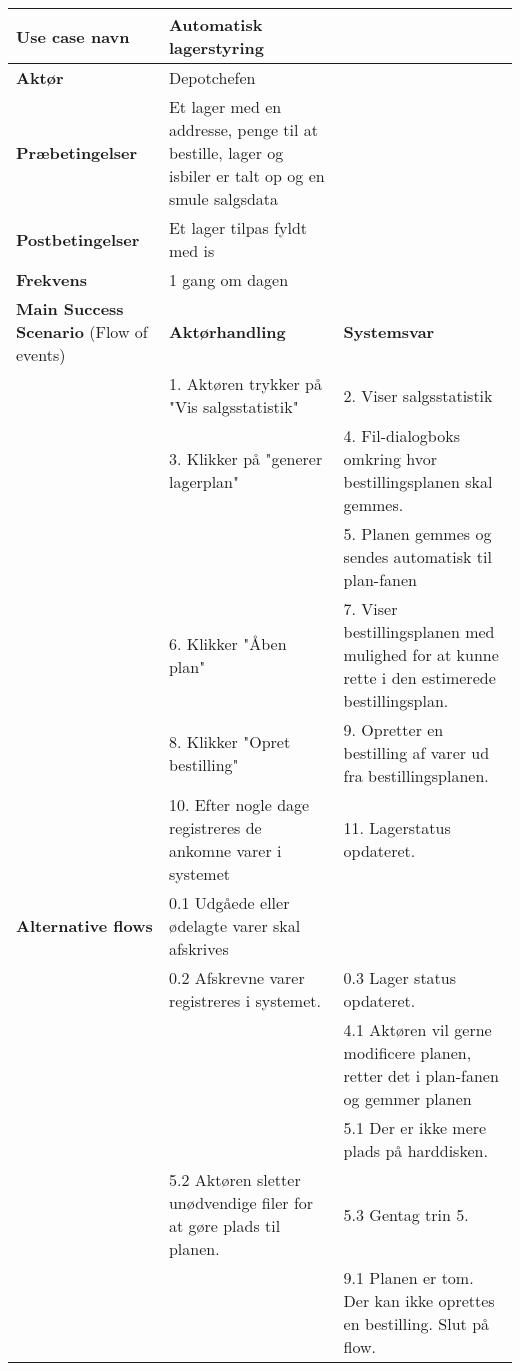 \begin{longtable}{ |p{120pt}|p{120pt}|p{120pt}| }
    \hline
    \textbf{Use case navn} & Automatisk lagerstyring & \\
    \hline
    \textbf{Aktør} & Depotchefen & \\
    \hline
    \textbf{Præbetingelser} & Et lager med en addresse, penge til at bestille, lager og isbiler er talt op og en smule salgsdata & \\
    \hline
    \textbf{Postbetingelser} & Et lager tilpas fyldt med is & \\
    \hline
    \textbf{Frekvens} & 1 gang om dagen & \\
    \hline
    \textbf{Main Success Scenario} (Flow of events) & \textbf{Aktørhandling} & \textbf{Systemsvar} \\
    \hline
    & 1. Aktøren trykker på "Vis salgsstatistik" & 2. Viser salgsstatistik \\
    \hline
    & 3. Klikker på "generer lagerplan" & 4. Fil-dialogboks omkring hvor bestillingsplanen skal gemmes. \\
    & & 5. Planen gemmes og sendes automatisk til plan-fanen \\
    \hline
    & 6. Klikker "Åben plan" & 7. Viser bestillingsplanen med mulighed for at kunne rette i den estimerede bestillingsplan. \\
    \hline
    & 8. Klikker "Opret bestilling" & 9. Opretter en bestilling af varer ud fra bestillingsplanen. \\
    \hline
    & 10. Efter nogle dage registreres de ankomne varer i systemet & 11. Lagerstatus opdateret. \\
    \hline
    \textbf{Alternative flows} & 0.1 Udgåede eller ødelagte varer skal afskrives & \\
    \hline
    & 0.2 Afskrevne varer registreres i systemet. & 0.3 Lager status opdateret. \\
    \hline
    & & 4.1 Aktøren vil gerne modificere planen, retter det i plan-fanen og gemmer planen & \\
    \hline
    & & 5.1 Der er ikke mere plads på harddisken. \\
    \hline
    & 5.2 Aktøren sletter unødvendige filer for at gøre plads til planen. & 5.3 Gentag trin 5.\\
    \hline
    & & 9.1 Planen er tom. Der kan ikke oprettes en bestilling. Slut på flow. \\
\end{longtable}

